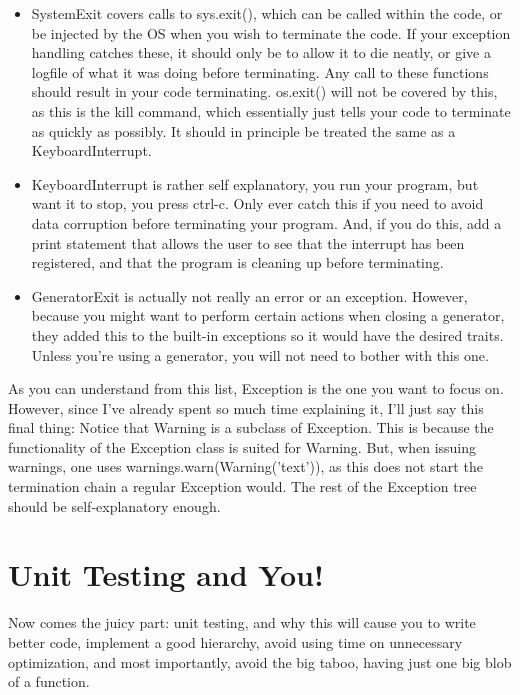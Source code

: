 \documentclass[10pt,a4paper]{article}
\begin{document}
\begin{itemize}

\item SystemExit covers calls to sys.exit(), which can be called within the code, or be injected by the OS when you wish to terminate the code. If your exception handling catches these, it should only be to allow it to die neatly, or give a logfile of what it was doing before terminating. Any call to these functions should result in your code terminating. os.exit() will not be covered by this, as this is the kill command, which essentially just tells your code to terminate as quickly as possibly. It should in principle be treated the same as a KeyboardInterrupt.

\item KeyboardInterrupt is rather self explanatory, you run your program, but want it to stop, you press ctrl-c. Only ever catch this if you need to avoid data corruption before terminating your program. And, if you do this, add a print statement that allows the user to see that the interrupt has been registered, and that the program is cleaning up before terminating.

\item GeneratorExit is actually not really an error or an exception. However, because you might want to perform certain actions when closing a generator, they added this to the built-in exceptions so it would have the desired traits. Unless you're using a generator, you will not need to bother with this one.

\end{itemize}

As you can understand from this list, Exception is the one you want to focus on. However, since I've already spent so much time explaining it, I'll just say this final thing: Notice that Warning is a subclass of Exception. This is because the functionality of the Exception class is suited for Warning. But, when issuing warnings, one uses warnings.warn(Warning('text')), as this does not start the termination chain a regular Exception would. The rest of the Exception tree should be self-explanatory enough. 

\newpage
\section{Unit Testing and You!}

Now comes the juicy part: unit testing, and why this will cause you to write better code, implement a good hierarchy, avoid using time on unnecessary optimization, and most importantly, avoid the big taboo, having just one big blob of a function.
\end{document}
